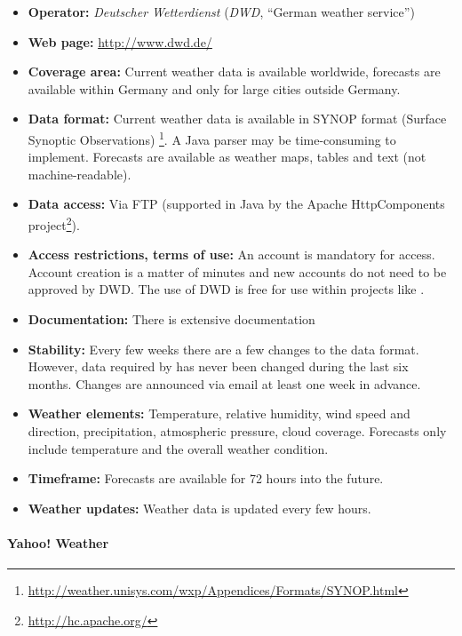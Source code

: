 \begin{itemize}
  \item \textbf{Operator:} \emph{Deutscher Wetterdienst} (\emph{DWD}, ``German weather service'')
  \item \textbf{Web page:} \href{http://www.dwd.de/}{http://www.dwd.de/}
  \item \textbf{Coverage area:} Current weather data is available worldwide, forecasts are available within Germany and only for large cities outside Germany.
  \item \textbf{Data format:} Current weather data is available in SYNOP format (Surface Synoptic Observations) \footnote{\href{http://weather.unisys.com/wxp/Appendices/Formats/SYNOP.html}{http://weather.unisys.com/wxp/Appendices/Formats/SYNOP.html}}. A Java parser may be time-consuming to implement. Forecasts are available as weather maps, tables and text (not machine-readable).
  \item \textbf{Data access:} Via FTP (supported in Java by the Apache HttpComponents project\footnote{\href{http://hc.apache.org/}{http://hc.apache.org/}}).
  \item \textbf{Access restrictions, terms of use:} An account is mandatory for access. Account creation is a matter of minutes and new accounts do not need to be approved by DWD. The use of DWD is free for use within projects like \thinkhome.
  \item \textbf{Documentation:} There is extensive documentation 
  \item \textbf{Stability:} Every few weeks there are a few changes to the data format. However, data required by \thinkhome has never been changed during the last six months. Changes are announced via email at least one week in advance.
  \item \textbf{Weather elements:} Temperature, relative humidity, wind speed and direction, precipitation, atmospheric pressure, cloud coverage. Forecasts only include temperature and the overall weather condition.
  \item \textbf{Timeframe:} Forecasts are available for 72 hours into the future.
  \item \textbf{Weather updates:} Weather data is updated every few hours.
\end{itemize}

\paragraph{Yahoo! Weather}

